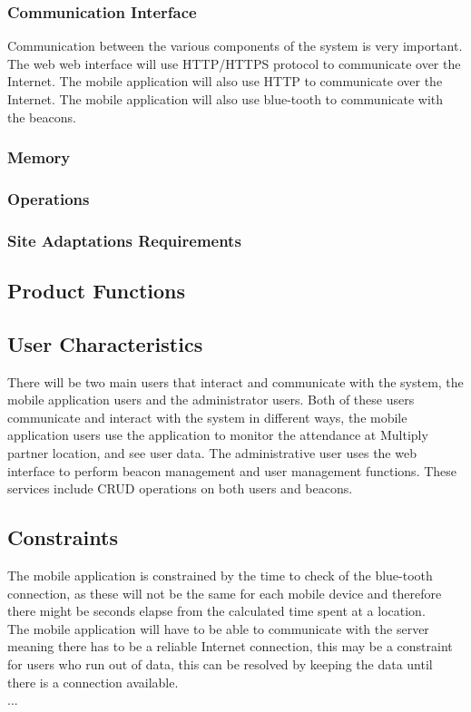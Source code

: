 \documentclass[11pt]{article}
\begin{document}
\subsubsection{Communication Interface}
Communication between the various components of the system is very important. The web web interface will use HTTP/HTTPS protocol to communicate over the Internet. The mobile application will also use HTTP to communicate over the Internet. The mobile  application will also use blue-tooth to communicate with the beacons.
\subsubsection{Memory}
\subsubsection{Operations}
\subsubsection{Site Adaptations Requirements}
\subsection{Product Functions}
\subsection{User Characteristics}
There will be two main users that interact and communicate with the system, the mobile application users and the administrator users. Both of these users communicate and interact with the system in different ways, the mobile application users use the application to monitor the attendance at Multiply partner location, and see user data. The administrative user uses the web interface to perform beacon management and user management functions. These services include CRUD operations on both users and beacons.
\subsection{Constraints}
The mobile application is constrained by the time to check of the blue-tooth connection, as these will not be the same for each mobile device and therefore there might be seconds elapse from the calculated time spent at a location.\\
The mobile application will have to be able to communicate with the server meaning there has to be a reliable Internet connection, this may be a constraint for  users who run out of data, this can be resolved by keeping the data until there is a connection available.\\
...
\end{document}
